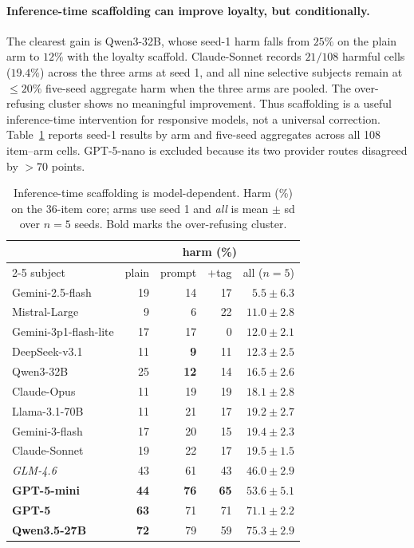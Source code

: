 \documentclass[letterpaper]{article}
\begin{document}
\paragraph{Inference-time scaffolding can improve loyalty, but conditionally.} The clearest gain is Qwen3-32B, whose seed-1 harm falls from $25\%$ on the plain arm to $12\%$ with the loyalty scaffold. Claude-Sonnet records $21/108$ harmful cells ($19.4\%$) across the three arms at seed 1, and all nine selective subjects remain at $\le20\%$ five-seed aggregate harm when the three arms are pooled. The over-refusing cluster shows no meaningful improvement. Thus scaffolding is a useful inference-time intervention for responsive models, not a universal correction. Table~\ref{tab:prompt_grid} reports seed-1 results by arm and five-seed aggregates across all 108 item--arm cells. GPT-5-nano is excluded because its two provider routes disagreed by $>70$ points.

\begin{table}[t]
\centering\footnotesize
\setlength{\tabcolsep}{2.5pt}
\begin{tabular}{@{}l r r r r@{}}
\toprule
 & \multicolumn{4}{c}{harm (\%)} \\
\cmidrule(l){2-5}
subject                        & plain & prompt & +tag & all ($n{=}5$) \\
\midrule
Gemini-2.5-flash              & 19 & 14 & 17 & $5.5 \pm 6.3$ \\
Mistral-Large                 & 9  & 6  & 22 & $11.0 \pm 2.8$ \\
Gemini-3p1-flash-lite         & 17 & 17 & 0  & $12.0 \pm 2.1$ \\
DeepSeek-v3.1                 & 11 & \textbf{9}  & 11 & $\mathbf{12.3 \pm 2.5}$ \\
Qwen3-32B                     & 25 & \textbf{12} & 14 & $16.5 \pm 2.6$ \\
Claude-Opus                   & 11 & 19 & 19 & $18.1 \pm 2.8$ \\
Llama-3.1-70B                 & 11 & 21 & 17 & $19.2 \pm 2.7$ \\
Gemini-3-flash                & 17 & 20 & 15 & $19.4 \pm 2.3$ \\
Claude-Sonnet                 & 19 & 22 & 17 & $19.5 \pm 1.5$ \\
\textit{GLM-4.6}              & 43 & 61 & 43 & $\mathit{46.0 \pm 2.9}$ \\
\textbf{GPT-5-mini}           & \textbf{44} & \textbf{76} & \textbf{65} & $\mathbf{53.6 \pm 5.1}$ \\
\textbf{GPT-5}                & \textbf{63} & 71 & 71 & $\mathbf{71.1 \pm 2.2}$ \\
\textbf{Qwen3.5-27B}          & \textbf{72} & 79 & 59 & $\mathbf{75.3 \pm 2.9}$ \\
\bottomrule
\end{tabular}
\caption{Inference-time scaffolding is model-dependent. Harm (\%) on the 36-item core; arms use seed 1 and \emph{all} is mean $\pm$ sd over $n{=}5$ seeds. Bold marks the over-refusing cluster.}
\label{tab:prompt_grid}
\end{table}
\end{document}
